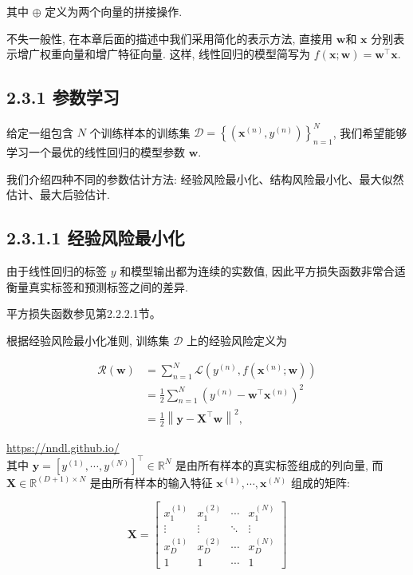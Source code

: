 \documentclass[10pt]{article}
\begin{document}
其中 $\oplus$ 定义为两个向量的拼接操作.

不失一般性, 在本章后面的描述中我们采用简化的表示方法, 直接用 $\boldsymbol{w}$和 $\boldsymbol{x}$ 分别表示增广权重向量和增广特征向量. 这样, 线性回归的模型简写为 $f(\boldsymbol{x} ; \boldsymbol{w})=\boldsymbol{w}^{\top} \boldsymbol{x}$.

\subsection*{2.3.1 参数学习}
给定一组包含 $N$ 个训练样本的训练集 $\mathcal{D}=\left\{\left(\boldsymbol{x}^{(n)}, y^{(n)}\right)\right\}_{n=1}^{N}$, 我们希望能够学习一个最优的线性回归的模型参数 $\boldsymbol{w}$.

我们介绍四种不同的参数估计方法: 经验风险最小化、结构风险最小化、最大似然估计、最大后验估计.

\subsection*{2.3.1.1 经验风险最小化}
由于线性回归的标签 $y$ 和模型输出都为连续的实数值, 因此平方损失函数非常合适衡量真实标签和预测标签之间的差异.

平方损失函数参见第2.2.2.1节。

根据经验风险最小化准则, 训练集 $\mathcal{D}$ 上的经验风险定义为


\begin{align*}
\mathcal{R}(\boldsymbol{w}) & =\sum_{n=1}^{N} \mathcal{L}\left(y^{(n)}, f\left(\boldsymbol{x}^{(n)} ; \boldsymbol{w}\right)\right)  \tag{2.34}\\
& =\frac{1}{2} \sum_{n=1}^{N}\left(y^{(n)}-\boldsymbol{w}^{\top} \boldsymbol{x}^{(n)}\right)^{2}  \tag{2.35}\\
& =\frac{1}{2}\left\|\boldsymbol{y}-\boldsymbol{X}^{\top} \boldsymbol{w}\right\|^{2}, \tag{2.36}
\end{align*}


\href{https://nndl.github.io/}{https://nndl.github.io/}\\
其中 $\boldsymbol{y}=\left[y^{(1)}, \cdots, y^{(N)}\right]^{\top} \in \mathbb{R}^{N}$ 是由所有样本的真实标签组成的列向量, 而 $\boldsymbol{X} \in \mathbb{R}^{(D+1) \times N}$ 是由所有样本的输入特征 $\boldsymbol{x}^{(1)}, \cdots, \boldsymbol{x}^{(N)}$ 组成的矩阵:

\[
\boldsymbol{X}=\left[\begin{array}{cccc}
x_{1}^{(1)} & x_{1}^{(2)} & \cdots & x_{1}^{(N)}  \tag{2.37}\\
\vdots & \vdots & \ddots & \vdots \\
x_{D}^{(1)} & x_{D}^{(2)} & \cdots & x_{D}^{(N)} \\
1 & 1 & \cdots & 1
\end{array}\right]
\]
\end{document}
